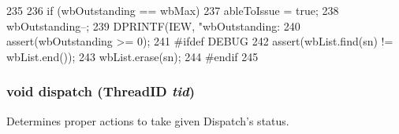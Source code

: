 \begin{DoxyCode}
235     {
236         if (wbOutstanding == wbMax)
237             ableToIssue = true;
238         wbOutstanding--;
239         DPRINTF(IEW, "wbOutstanding: %
240         assert(wbOutstanding >= 0);
241 #ifdef DEBUG
242         assert(wbList.find(sn) != wbList.end());
243         wbList.erase(sn);
244 #endif
245     }
\end{DoxyCode}
\hypertarget{classDefaultIEW_ae7e149739c0db3dcb5d49119bd675ee2}{
\subsubsection[{dispatch}]{\setlength{\rightskip}{0pt plus 5cm}void dispatch ({\bf ThreadID} {\em tid})}}
\label{classDefaultIEW_ae7e149739c0db3dcb5d49119bd675ee2}
Determines proper actions to take given Dispatch's status. 


